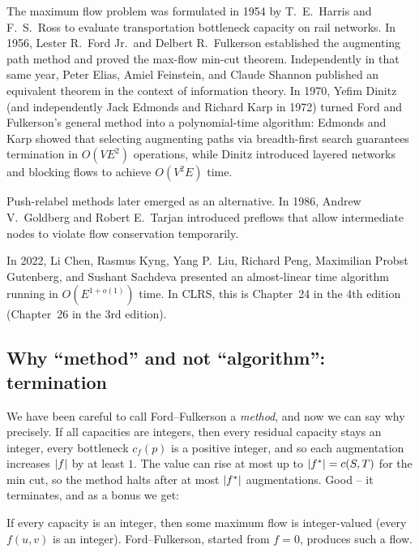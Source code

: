 \begin{historybox}
The maximum flow problem was formulated in 1954 by T.\ E.\ Harris and F.\ S.\ Ross to evaluate transportation bottleneck capacity on rail networks. In 1956, Lester R.\ Ford Jr.\ and Delbert R.\ Fulkerson established the augmenting path method and proved the max-flow min-cut theorem. Independently in that same year, Peter Elias, Amiel Feinstein, and Claude Shannon published an equivalent theorem in the context of information theory. In 1970, Yefim Dinitz (and independently Jack Edmonds and Richard Karp in 1972) turned Ford and Fulkerson's general method into a polynomial-time algorithm: Edmonds and Karp showed that selecting augmenting paths via breadth-first search guarantees termination in $O(V E^2)$ operations, while Dinitz introduced layered networks and blocking flows to achieve $O(V^2 E)$ time.

Push-relabel methods later emerged as an alternative. In 1986, Andrew V.\ Goldberg and Robert E.\ Tarjan introduced preflows that allow intermediate nodes to violate flow conservation temporarily.

In 2022, Li Chen, Rasmus Kyng, Yang P.\ Liu, Richard Peng, Maximilian Probst Gutenberg, and Sushant Sachdeva presented an almost-linear time algorithm running in $O(E^{1+o(1)})$ time. In CLRS, this is Chapter~24 in the 4th edition (Chapter~26 in the 3rd edition).
\end{historybox}

\subsection{Why ``method'' and not ``algorithm'': termination}
\label{ch26:termination}

We have been careful to call Ford--Fulkerson a \emph{method}, and now we can say
why precisely. If all capacities are integers, then every residual capacity
stays an integer, every bottleneck $c_f(p)$ is a positive integer, and so each
augmentation increases $\lvert f\rvert$ by at least $1$. The value can rise at most up
to $\lvert f^*\rvert = c(S,T)$ for the min cut, so the method halts after at most
$\lvert f^*\rvert$ augmentations. Good -- it terminates, and as a bonus we get:

\begin{corollary}
\label{ch26:integrality}
If every capacity is an integer, then some maximum flow is integer-valued
(every $f(u,v)$ is an integer). Ford--Fulkerson, started from $f=0$, produces
such a flow.
\end{corollary}

